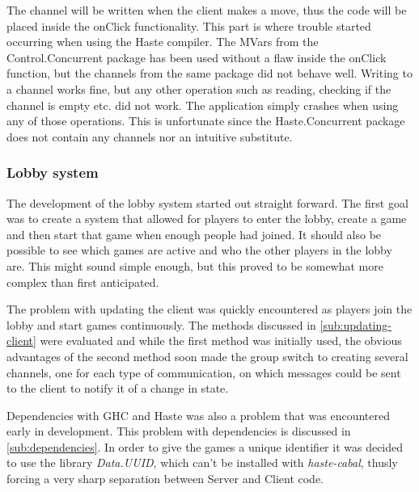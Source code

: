 \documentclass[a4paper]{article}
\begin{document}
The channel will be written when the client makes a move, thus the code will be placed inside the onClick functionality. This part is where trouble started occurring when using the Haste compiler. The MVars from the Control.Concurrent package has been used without a flaw inside the onClick function, but the channels from the same package did not behave well. Writing to a channel works fine, but any other operation such as reading, checking if the channel is empty etc. did not work. The application simply crashes when using any of those operations. This is unfortunate since the Haste.Concurrent package does not contain any channels nor an intuitive substitute. 




\subsubsection{Lobby system}
The development of the lobby system started out straight forward. The first goal was to create a system that allowed for players to enter the lobby, create a game and then start that game when enough people had joined. It should also be possible to see which games are active and who the other players in the lobby are. This might sound simple enough, but this proved to be somewhat more complex than first anticipated. 

The problem with updating the client was quickly encountered as players join the lobby and start games continuously. The methods discussed in \cref{sub:updating-client} were evaluated and while the first method was initially used, the obvious advantages of the second method soon made the group switch to creating several channels, one for each type of communication, on which messages could be sent to the client to notify it of a change in state.

Dependencies with GHC and Haste was also a problem that was encountered early in development. This problem with dependencies is discussed in \cref{sub:dependencies}. In order to give the games a unique identifier it was decided to use the library \textit{Data.UUID}, which can't be installed with \textit{haste-cabal}, thusly forcing a very sharp separation between Server and Client code. 




\end{document}
